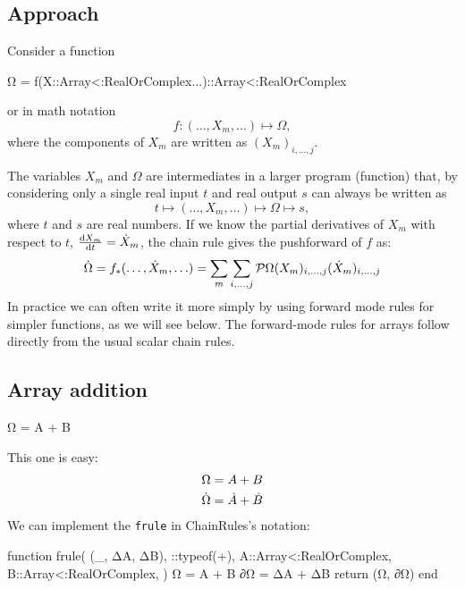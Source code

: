 \documentclass[../../main.tex]{subfiles}
\begin{document}
\begin{refsection}
\subsection{Approach}\label{approach}

Consider a function
\begin{juliacode}
Ω = f(X::Array{<:RealOrComplex}...)::Array{<:RealOrComplex}
\end{juliacode}
or in math notation
\[f \colon (\ldots, X_m, \ldots) \mapsto \Omega,\]
where the components of $X_m$ are written as $(X_m)_{i,\ldots,j}$.

The variables $X_m$ and $\Omega$ are intermediates in a larger program (function) that, by considering only a single real input $t$ and real output $s$ can always be written as
\[t \mapsto (\ldots, X_m, \ldots) \mapsto \Omega \mapsto s,\]
where $t$ and $s$ are real numbers.
If we know the partial derivatives of $X_m$ with respect to $t$, $\dv{X_m}{t} = \dot{X}_m$, the chain rule gives the pushforward of $f$ as:
\begin{equation} \label{pf}
	\Dtan{\Omega}
	= f_*(\ldots, \Dtan{X}_m, \ldots)
	= \sum_m \sum_{i, \ldots, j}
	\pv{\Omega}{(X_m)_{i,\ldots,j}} (\Dtan{X}_m)_{i,\ldots,j}
\end{equation}
In practice we can often write it more simply by using forward mode rules for simpler functions, as we will see below.
The forward-mode rules for arrays follow directly from the usual scalar chain rules.

\subsection{Array addition}\label{array-addition}
\begin{juliacode}
Ω = A + B
\end{juliacode}
This one is easy:
\begin{align*}
	\Omega        & = A + B               \\
	\dot{\Omega} & = \dot{A} + \dot{B}
\end{align*}
We can implement the \texttt{frule} in ChainRules's notation:
\begin{juliacode}
function frule(
    (_, ΔA, ΔB),
    ::typeof(+),
    A::Array{<:RealOrComplex},
    B::Array{<:RealOrComplex},
)
    Ω = A + B
    ∂Ω = ΔA + ΔB
    return (Ω, ∂Ω)
end
\end{juliacode}

\end{refsection}
\end{document}

